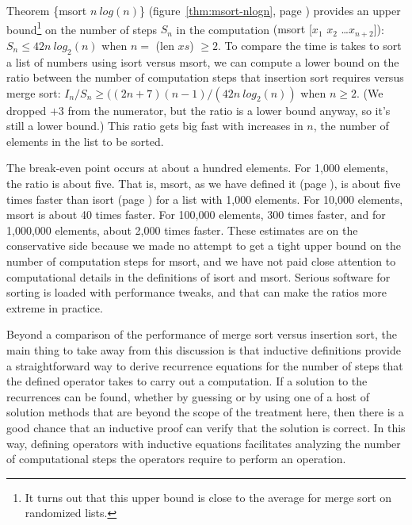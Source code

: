 Theorem \{msort $n~log(n)$\}
(figure~\ref{thm:msort-nlogn}, page \pageref{thm:msort-nlogn}) provides
an upper bound\footnote{It
turns out that this upper bound is close to the average
for merge sort on randomized lists.}
on the number of steps $S_n$ in the computation
\textsf{(msort [$x_1$ $x_2$ \dots $x_{n+2}$])}:
$S_{n} \leq 42n~log_2(n)$ when $n =$ (len $xs$) $\geq 2$.
To compare the time is takes to sort a
list of numbers using \textsf{isort} versus \textsf{msort},
we can compute a lower bound on the ratio between
the number of computation steps that insertion sort requires
versus merge sort:
$I_n/S_n \geq ((2n+7)(n-1)/(42n~log_2(n))$ when $n \geq 2$.
(We dropped $+3$ from the numerator, but the ratio is a lower bound anyway,
so it's still a lower bound.)
This ratio gets big fast with increases in $n$, the number of elements
in the list to be sorted.

The
break-even point occurs at about a hundred elements.
For 1,000 elements, the ratio is about five.
That is, \textsf{msort}, as we have defined it (page \pageref{defun:msort-copy}),
is about five times faster
than \textsf{isort} (page \pageref{defun:insert-isort})
for a list with 1,000 elements.
For 10,000 elements, \textsf{msort} is about 40 times faster.
For 100,000 elements, 300 times faster,
and for 1,000,000 elements, about 2,000 times faster.
These estimates are on the conservative side
because we made no attempt to get a tight
upper bound on the number of computation steps for \textsf{msort},
and we have not paid close attention to computational details
in the definitions of \textsf{isort} and  \textsf{msort}.
Serious software for sorting is loaded with performance tweaks,
and that can make the ratios more extreme in practice.

Beyond a comparison of the performance of merge sort
versus insertion sort, the main thing to take away from this discussion
is that inductive definitions provide a straightforward way to
derive recurrence equations for the number of steps that the defined operator
takes to carry out a computation.
If a solution to the recurrences can be found,
whether by guessing or by using one of a host of solution methods
that are beyond the scope of the treatment here,
then there is a good chance that an
inductive proof
can verify that the solution is correct.
In this way, defining operators with inductive equations
facilitates analyzing the number of computational
steps the operators require to perform an operation.


